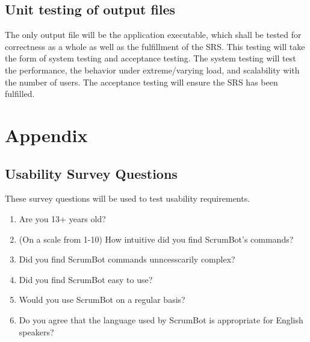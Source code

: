 \documentclass[12pt, titlepage]{article}
\begin{document}
\subsection{Unit testing of output files}		
The only output file will be the application executable, which shall be tested for correctness as a whole as well as the fulfillment of the SRS. This testing will take the form of system testing and acceptance testing. The system testing will test the performance, the behavior under extreme/varying load, and scalability with the number of users. The acceptance testing will ensure the SRS has been fulfilled.



\newpage

\section{Appendix}


\subsection{Usability Survey Questions}
These survey questions will be used to test usability requirements.
\begin{enumerate}
    \item Are you 13+ years old?
    \item (On a scale from 1-10) How intuitive did you find ScrumBot's commands?
    \item Did you find ScrumBot commands unncesscarily complex?
    \item Did you find ScrumBot easy to use?
    \item Would you use ScrumBot on a regular basis?
    \item Do you agree that the language used by ScrumBot is appropriate for English speakers?
\end{enumerate}
\end{document}
